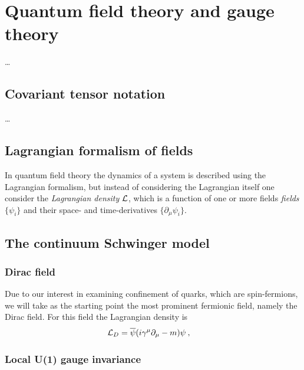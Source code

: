 \documentclass[../main.tex]{subfiles} %
\begin{document}
\chapter{Quantum field theory and gauge theory} \label{chap:ContinuumQFT}

\ldots



\section{Covariant tensor notation}

\ldots



\section{Lagrangian formalism of fields}

In quantum field theory the dynamics of a system is described using the Lagrangian formalism, but instead of considering the Lagrangian itself one consider the \emph{Lagrangian density}  $\mathcal{L}$, which is a function of one or more fields \emph{fields}  $\{\psi_i\}$ and their space- and time-derivatives $\{\partial_\mu \psi_i\}$.



\section{The continuum Schwinger model}

\subsection{Dirac field}

Due to our interest in examining confinement of quarks, which are spin-\half fermions, we will take as the starting point the most prominent fermionic field, namely the Dirac field. For this field the Lagrangian density  is
\begin{align}
    \mathcal{L}_D &= \overline{\psi} (i \gamma^\mu \partial_\mu - m) \psi \: ,
\end{align}



\subsection{Local U(1) gauge invariance}
\end{document}
